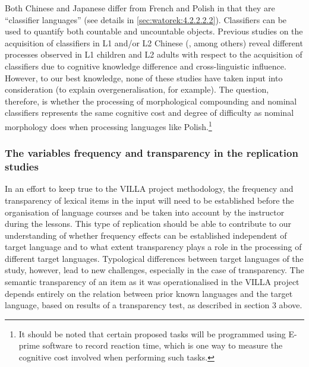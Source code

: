 \documentclass[output=paper,colorlinks,citecolor=brown,modfonts,nonflat]{../langscibook}
\begin{document}
Both Chinese and Japanese differ from French and Polish in that they are “classifier languages” (see details in \ref{sec:watorek:4.2.2.2.2}). Classifiers can be used to quantify both countable and uncountable objects. Previous studies on the acquisition of classifiers in L1 and/or L2 Chinese (\citealt{Liang2008,Gong2010,Kong2012}, among others) reveal different processes observed in L1 children and L2 adults with respect to the acquisition of classifiers due to cognitive knowledge difference and cross-linguistic influence. However, to our best knowledge, none of these studies have taken input into consideration (to explain overgeneralisation, for example). The question, therefore, is whether the processing of morphological compounding and nominal classifiers represents the same cognitive cost and degree of difficulty as nominal morphology does when processing languages like Polish.{\footnote{It should be noted that certain proposed tasks will be programmed using E-prime software to record reaction time, which is one way to measure the cognitive cost involved when performing such tasks.}}

\subsubsection{The variables frequency and transparency in the replication studies}\label{sec:watorek:4.1.2}

In an effort to keep true to the VILLA project methodology, the frequency and transparency of lexical items in the input will need to be established before the organisation of language courses and be taken into account by the instructor during the lessons. This type of replication should be able to contribute to our understanding of whether frequency effects can be established independent of target language and to what extent transparency plays a role in the processing of different target languages. Typological differences between target languages of the study, however, lead to new challenges, especially in the case of transparency. The semantic transparency of an item as it was operationalised in the VILLA project depends entirely on the relation between prior known languages and the target language, based on results of a transparency test, as described in section 3 above.
\end{document}
